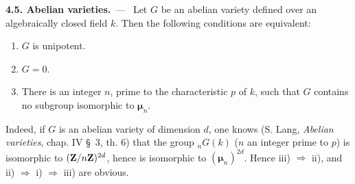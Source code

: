 \par\medskip\noindent\textbf{4.5. Abelian varieties.}\ ---\ \label{XVII.4.5}
Let $G$ be an abelian variety defined over an algebraically closed field $k$. Then the following conditions are equivalent:
\begin{enumerate}[label=\textup{\roman*)}]
\item $G$ is unipotent.
\item $G=0$.
\item There is an integer $n$, prime to the characteristic $p$ of $k$, such that $G$ contains no subgroup isomorphic to $\boldsymbol\mu_n$.
\end{enumerate}
Indeed, if $G$ is an abelian variety of dimension $d$, one knows (\cf S. Lang, \emph{Abelian varieties}, chap. IV \S~3, th. 6) that the group ${}_nG(k)$ ($n$ an integer prime to $p$) is isomorphic to $(\mathbf{Z}/n\mathbf{Z})^{2d}$, hence is isomorphic to $(\boldsymbol\mu_n)^{2d}$. Hence iii) $\Rightarrow$ ii), and ii) $\Rightarrow$ i) $\Rightarrow$ iii) are obvious.


